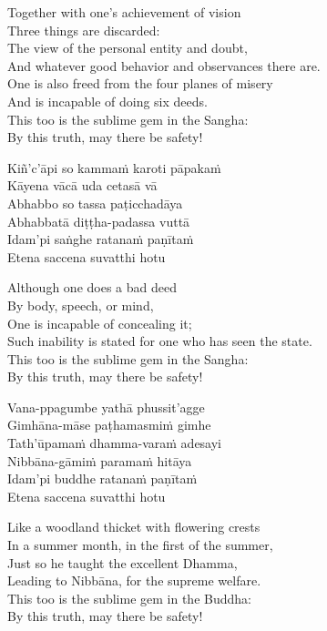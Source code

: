 \begin{english-verses}
  Together with one's achievement of vision\\
  Three things are discarded:\\
  The view of the personal entity and doubt,\\
  And whatever good behavior and observances there are.\\
  One is also freed from the four planes of misery\\
  And is incapable of doing six deeds.\\
  This too is the sublime gem in the Sangha:\\
  By this truth, may there be safety!
\end{english-verses}

\begin{pali-hang-continued}
  Kiñ'c'āpi so kammaṁ karoti pāpakaṁ\\
  Kāyena vācā uda cetasā vā\\
  Abhabbo so tassa paṭicchadāya\\
  Abhabbatā diṭṭha-padassa vuttā\\
  Idam'pi saṅghe ratanaṁ paṇītaṁ\\
  Etena saccena suvatthi hotu
\end{pali-hang-continued}

\begin{english-verses}
  Although one does a bad deed\\
  By body, speech, or mind,\\
  One is incapable of concealing it;\\
  Such inability is stated for one who has seen the state.\\
  This too is the sublime gem in the Sangha:\\
  By this truth, may there be safety!
\end{english-verses}

\begin{pali-hang-continued}
  Vana-ppagumbe yathā phussit'agge\\
  Gimhāna-māse paṭhamasmiṁ gimhe\\
  Tath'ūpamaṁ dhamma-varaṁ adesayi\\
  Nibbāna-gāmiṁ paramaṁ hitāya\\
  Idam'pi buddhe ratanaṁ paṇītaṁ\\
  Etena saccena suvatthi hotu
\end{pali-hang-continued}

\begin{english-verses}
  Like a woodland thicket with flowering crests\\
  In a summer month, in the first of the summer,\\
  Just so he taught the excellent Dhamma,\\
  Leading to Nibbāna, for the supreme welfare.\\
  This too is the sublime gem in the Buddha:\\
  By this truth, may there be safety!
\end{english-verses}

